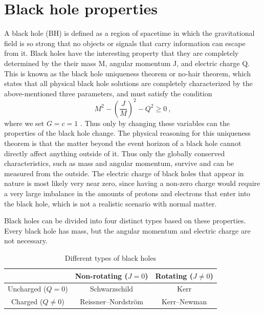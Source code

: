 \documentclass[english, oneside]{HYgradu}
\begin{document}
\section{Black hole properties}

A black hole (BH) is defined as a region of spacetime in which the gravitational field is so strong that no objects or signals that carry information can escape from it. Black holes have the interesting property that they are completely determined by the their mass M, angular momentum J, and electric charge Q. This is known as the black hole uniqueness theorem or no-hair theorem, which states that all physical black hole solutions are completely characterized by the above-mentioned three parameters, and must satisfy the condition 
\begin{equation} \label{equ:bhunique}
M^2 - \left( \frac{J}{M} \right)^2 - Q^2 \geq 0 \ ,
\end{equation}
where we set $G = c = 1$ \citep{mazur:2001}.
Thus only by changing these variables can the properties of the black hole change. The physical reasoning for this uniqueness theorem is that the matter beyond the event horizon of a black hole cannot directly affect anything outside of it. Thus only the globally conserved characteristics, such as mass and angular momentum, survive and can be measured from the outside. The electric charge of black holes that appear in nature is most likely very near zero, since having a non-zero charge would require a very large imbalance in the amounts of protons and electrons that enter into the black hole, which is not a realistic scenario with normal matter.

Black holes can be divided into four distinct types based on these properties. Every black hole has mass, but the angular momentum and electric charge are not necessary.
\begin{table}[htb]
\centering
\caption{Different types of black holes}
\begin{tabular}{|c|c|c|}
\hline
 & Non-rotating ($J = 0$) & Rotating ($J \neq 0$) \\ \hline
Uncharged ($Q = 0$) & Schwarzschild & Kerr \\ \hline
Charged ($Q \neq 0$) & Reissner–Nordström & Kerr–Newman \\ \hline
\end{tabular}
\end{table}
\end{document}
